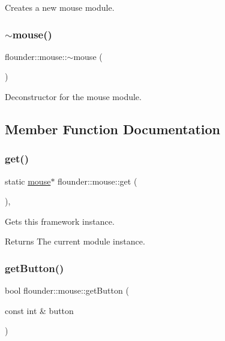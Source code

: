 Creates a new mouse module. 

\mbox{\label{classflounder_1_1mouse_a3038f39f358e37d15059af6c1675497b}} 
\subsubsection{\texorpdfstring{$\sim$mouse()}{~mouse()}}
{\footnotesize\ttfamily flounder\+::mouse\+::$\sim$mouse (\begin{DoxyParamCaption}{ }\end{DoxyParamCaption})}



Deconstructor for the mouse module. 



\subsection{Member Function Documentation}
\mbox{\label{classflounder_1_1mouse_ac164dd73c45f0babcb67c9e24f50eff2}} 
\subsubsection{\texorpdfstring{get()}{get()}}
{\footnotesize\ttfamily static \hyperlink{classflounder_1_1mouse}{mouse}$\ast$ flounder\+::mouse\+::get (\begin{DoxyParamCaption}{ }\end{DoxyParamCaption})\hspace{0.3cm}{\ttfamily [inline]}, {\ttfamily [static]}}



Gets this framework instance. 

\begin{DoxyReturn}{Returns}
The current module instance. 
\end{DoxyReturn}
\mbox{\label{classflounder_1_1mouse_a327552b319742adbb721733510f8a828}} 
\subsubsection{\texorpdfstring{get\+Button()}{getButton()}}
{\footnotesize\ttfamily bool flounder\+::mouse\+::get\+Button (\begin{DoxyParamCaption}\item[{const int \&}]{button }\end{DoxyParamCaption})}




